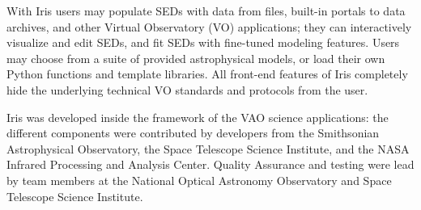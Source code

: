 \documentclass[final,5p,authoryear]{elsarticle}
\begin{document}
With Iris users may populate SEDs with data from files, built-in portals to data
archives, and other Virtual Observatory (VO) applications; they can
interactively visualize and edit SEDs, and fit SEDs with fine-tuned modeling
features. Users may choose from a suite of provided astrophysical models, or
load their own Python functions and template libraries. All front-end features
of Iris completely hide the underlying technical VO standards and protocols from
the user.




Iris was developed inside the framework of the VAO science applications: the
different components were contributed by developers from the Smithsonian
Astrophysical Observatory, the Space Telescope Science Institute, and the NASA
Infrared Processing and Analysis Center. Quality Assurance and testing were lead
by team members at the National Optical Astronomy Observatory and Space
Telescope Science Institute.
\end{document}
